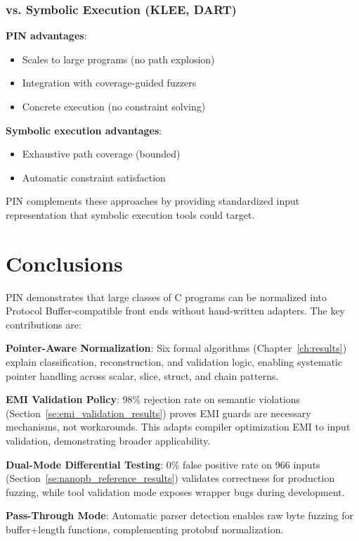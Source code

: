 \documentclass[doublespace,nopageskip]{VTthesis}
\begin{document}
\subsection{vs. Symbolic Execution (KLEE, DART)}

\textbf{PIN advantages}:
\begin{itemize}
    \item Scales to large programs (no path explosion)
    \item Integration with coverage-guided fuzzers
    \item Concrete execution (no constraint solving)
\end{itemize}

\textbf{Symbolic execution advantages}:
\begin{itemize}
    \item Exhaustive path coverage (bounded)
    \item Automatic constraint satisfaction
    \end{itemize}

PIN complements these approaches by providing standardized input representation that symbolic execution tools could target.

\chapter{Conclusions} \label{ch:conclusions}

PIN demonstrates that large classes of C programs can be normalized into Protocol Buffer-compatible front ends without hand-written adapters. The key contributions are:

\textbf{Pointer-Aware Normalization}: Six formal algorithms (Chapter~\ref{ch:results}) explain classification, reconstruction, and validation logic, enabling systematic pointer handling across scalar, slice, struct, and chain patterns.

\textbf{EMI Validation Policy}: 98\% rejection rate on semantic violations (Section~\ref{se:emi_validation_results}) proves EMI guards are necessary mechanisms, not workarounds. This adapts compiler optimization EMI to input validation, demonstrating broader applicability.

\textbf{Dual-Mode Differential Testing}: 0\% false positive rate on 966 inputs (Section~\ref{se:nanopb_reference_results}) validates correctness for production fuzzing, while tool validation mode exposes wrapper bugs during development.

\textbf{Pass-Through Mode}: Automatic parser detection enables raw byte fuzzing for buffer+length functions, complementing protobuf normalization.
\end{document}
